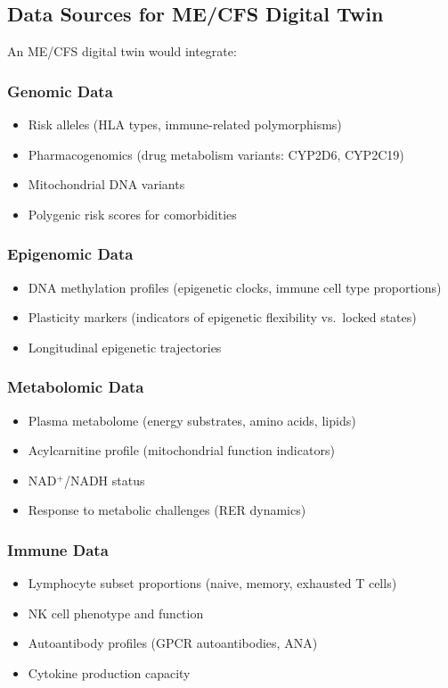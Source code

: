 \subsection{Data Sources for ME/CFS Digital Twin}

An ME/CFS digital twin would integrate:

\subsubsection{Genomic Data}
\begin{itemize}
    \item Risk alleles (HLA types, immune-related polymorphisms)
    \item Pharmacogenomics (drug metabolism variants: CYP2D6, CYP2C19)
    \item Mitochondrial DNA variants
    \item Polygenic risk scores for comorbidities
\end{itemize}

\subsubsection{Epigenomic Data}
\begin{itemize}
    \item DNA methylation profiles (epigenetic clocks, immune cell type proportions)
    \item Plasticity markers (indicators of epigenetic flexibility vs.\ locked states)
    \item Longitudinal epigenetic trajectories
\end{itemize}

\subsubsection{Metabolomic Data}
\begin{itemize}
    \item Plasma metabolome (energy substrates, amino acids, lipids)
    \item Acylcarnitine profile (mitochondrial function indicators)
    \item NAD$^+$/NADH status
    \item Response to metabolic challenges (RER dynamics)
\end{itemize}

\subsubsection{Immune Data}
\begin{itemize}
    \item Lymphocyte subset proportions (naive, memory, exhausted T cells)
    \item NK cell phenotype and function
    \item Autoantibody profiles (GPCR autoantibodies, ANA)
    \item Cytokine production capacity
\end{itemize}

